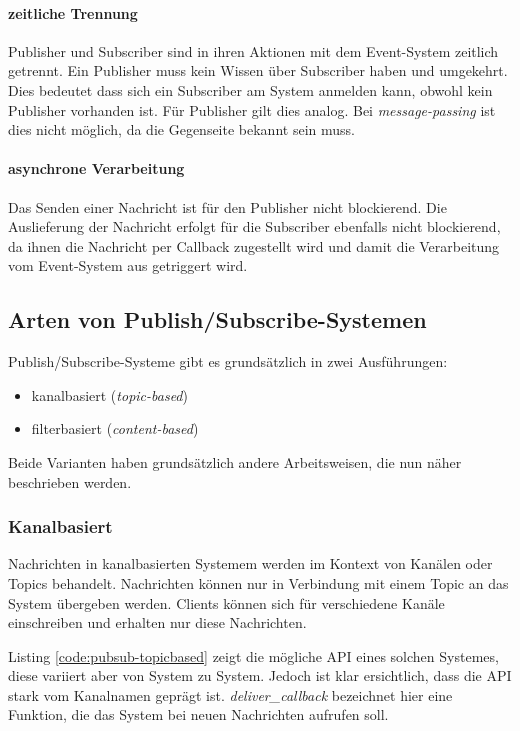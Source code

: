 \paragraph{zeitliche Trennung}
Publisher und Subscriber sind in ihren Aktionen mit dem Event-System zeitlich getrennt. Ein Publisher muss kein Wissen über Subscriber haben und umgekehrt. Dies bedeutet dass sich ein Subscriber am System anmelden kann, obwohl kein Publisher vorhanden ist. Für Publisher gilt dies analog. Bei \emph{message-passing} ist dies nicht möglich, da die Gegenseite bekannt sein muss.


\paragraph{asynchrone Verarbeitung}
Das Senden einer Nachricht ist für den Publisher nicht blockierend. Die Auslieferung der Nachricht erfolgt für die Subscriber ebenfalls nicht blockierend, da ihnen die Nachricht per Callback zugestellt wird und damit die Verarbeitung vom Event-System aus getriggert wird.


\subsection{Arten von Publish/Subscribe-Systemen}
Publish/Subscribe-Systeme gibt es grundsätzlich in zwei Ausführungen:
\begin{itemize}
\item kanalbasiert (\emph{topic-based})
\item filterbasiert (\emph{content-based})
\end{itemize}

Beide Varianten haben grundsätzlich andere Arbeitsweisen, die nun näher beschrieben werden.

\subsubsection{Kanalbasiert}
\label{chap:grundlagen:pubsub:kanalbasiert}
Nachrichten in kanalbasierten Systemem werden im Kontext von Kanälen oder Topics behandelt. Nachrichten können nur in Verbindung mit einem Topic an das System übergeben werden. Clients können sich für verschiedene Kanäle einschreiben und erhalten nur diese Nachrichten.

Listing \vref{code:pubsub-topicbased} zeigt die mögliche API eines solchen Systemes, diese variiert aber von System zu System. Jedoch ist klar ersichtlich, dass die API stark vom Kanalnamen geprägt ist. \emph{deliver\_callback} bezeichnet hier eine Funktion, die das System bei neuen Nachrichten aufrufen soll.

